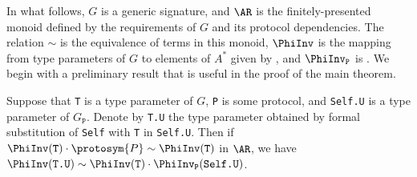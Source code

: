 \documentclass[../generics]{subfiles}
\begin{document}
In what follows, $G$ is a generic signature, and $\AR$ is the finitely-presented monoid defined by the requirements of $G$ and its protocol dependencies. The relation $\sim$ is the equivalence of terms in this monoid, $\PhiInv$ is the mapping from type parameters of $G$ to elements of $A^*$ given by , and $\PhiInv_\texttt{P}$ is . We begin with a preliminary result that is useful in the proof of the main theorem.

\begin{lemma}\label{type param composition lemma}
Suppose that \texttt{T} is a type parameter of $G$, \texttt{P} is some protocol, and \texttt{Self.U} is a type parameter of $G_\texttt{P}$. Denote by \texttt{T.U} the type parameter obtained by formal substitution of \texttt{Self} with \texttt{T} in \texttt{Self.U}. Then if $\PhiInv(\texttt{T})\cdot\protosym{P}\sim\PhiInv(\texttt{T})$ in $\AR$, we have $\PhiInv(\texttt{T.U})\sim\PhiInv(\texttt{T})\cdot\PhiInv_\texttt{P}(\texttt{Self.U})$.
\end{lemma}
\end{document}

